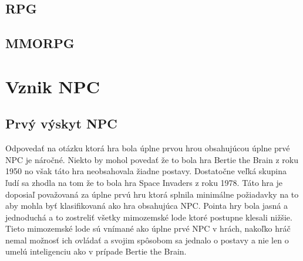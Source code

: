 \documentclass[10pt,twoside,slovak,a4paper]{article}
\begin{document}
\subsection{RPG} \label{RPG}
\subsection{MMORPG} \label{MMORPG}


\section{Vznik NPC}
\subsection{Prvý výskyt NPC} \label{NPC 1 time}
Odpovedať na otázku ktorá hra bola úplne prvou hrou obsahujúcou úplne prvé NPC je náročné. Niekto by mohol povedať že to bola hra Bertie the Brain z roku 1950 no však táto hra neobsahovala žiadne postavy. Dostatočne veľká skupina ľudí sa zhodla na tom že to bola hra Space Invaders z roku 1978. Táto hra je doposiaľ považovaná za úplne prvú hru ktorá splnila minimálne požiadavky na to aby mohla byť klasifikovaná ako hra obsahujúca NPC. Pointa hry bola jasná a jednoduchá a to zostreliť všetky mimozemské lode ktoré postupne klesali nižšie. Tieto mimozemské lode sú vnímané ako úplne prvé NPC v hrách, nakoľko hráč nemal možnosť ich ovládať a svojim spôsobom sa jednalo o postavy a nie len o umelú inteligenciu ako v prípade Bertie the Brain.  
\end{document}
